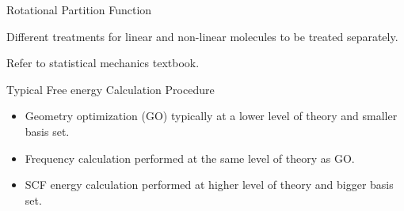 \documentclass[aspectratio=169]{beamer}
\begin{document}
\begin{frame}{Rotational Partition Function}

Different treatments for linear and non-linear molecules to be treated separately.

Refer to statistical mechanics textbook.

\end{frame} 


\begin{frame}{Typical Free energy Calculation Procedure}

\begin{figure}
    \centering
{}
\end{figure}
\begin{itemize}
    \item Geometry optimization (GO) typically at a lower level of theory and smaller basis set.
    \item Frequency calculation performed at the same level of theory as GO.
    \item SCF energy calculation performed at higher level of theory and bigger basis set.
\end{itemize}

\end{frame} 
\end{document}
